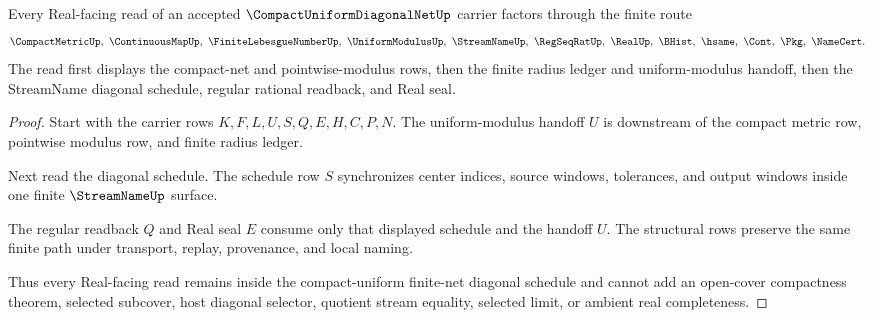\begin{theorem}
\label{thm:compact-uniform-diagonal-net-schedule-handoff}
Every Real-facing read of an accepted $\CompactUniformDiagonalNetUp$ carrier factors through the finite route
$$
\CompactMetricUp,\ \ContinuousMapUp,\ \FiniteLebesgueNumberUp,\ \UniformModulusUp,\ \StreamNameUp,\ \RegSeqRatUp,\ \RealUp,\ \BHist,\ \hsame,\ \Cont,\ \Pkg,\ \NameCert .
$$
The read first displays the compact-net and pointwise-modulus rows, then the finite radius ledger and uniform-modulus handoff, then the StreamName diagonal schedule, regular rational readback, and Real seal.
\end{theorem}
\begin{proof}
Start with the carrier rows $K,F,L,U,S,Q,E,H,C,P,N$. The uniform-modulus handoff $U$ is downstream of the compact metric row, pointwise modulus row, and finite radius ledger.

Next read the diagonal schedule. The schedule row $S$ synchronizes center indices, source windows, tolerances, and output windows inside one finite $\StreamNameUp$ surface.

The regular readback $Q$ and Real seal $E$ consume only that displayed schedule and the handoff $U$. The structural rows preserve the same finite path under transport, replay, provenance, and local naming.

Thus every Real-facing read remains inside the compact-uniform finite-net diagonal schedule and cannot add an open-cover compactness theorem, selected subcover, host diagonal selector, quotient stream equality, selected limit, or ambient real completeness.
\end{proof}



